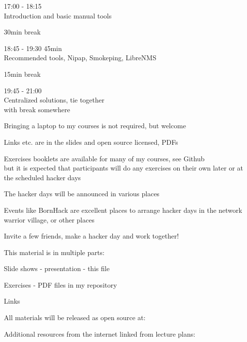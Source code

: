 \documentclass[Screen16to9,17pt]{foils}
\begin{document}
\begin{list2}
\item 17:00 - 18:15\\
Introduction and basic manual tools
\item 30min break\\

\item 18:45 - 19:30 45min \\
Recommended tools, Nipap, Smokeping, LibreNMS
\item 15min break\\

\item 19:45 - 21:00\\
Centralized solutions, tie together\\

with break somewhere
\end{list2}



\begin{list2}
\item Bringing a laptop to my courses is not required, but welcome
\item Links etc. are in the slides and open source licensed, PDFs
\item Exercises booklets are available for many of my courses, see Github\\
but it is expected that participants will do any exercises on their own later or at the scheduled hacker days
\item The hacker days will be announced in various places

\item Events like BornHack are excellent places to arrange hacker days in the network warrior village, or other places
\end{list2}

\vskip 1cm

\centerline{\LARGE Invite a few friends, make a hacker day and work together!}


\begin{list1}
\item This material is in multiple parts:
\begin{list2}
\item Slide shows - presentation - this file
\item Exercises - PDF files in my repository
\end{list2}
\item Links
\begin{list2}
\item All materials will be released as open source at:\\
\item Additional resources from the internet linked from lecture plans:\\
\end{list2}
\end{list1}
\end{document}
